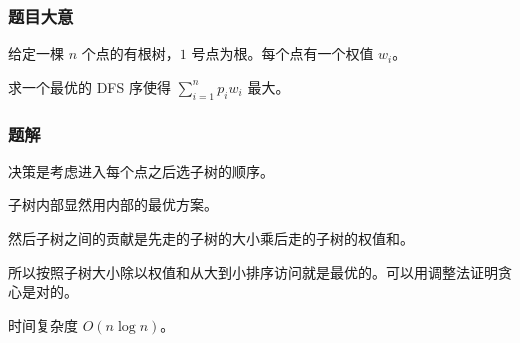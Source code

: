 

\frame
{
  \frametitle{题目大意}

给定一棵 $n$ 个点的有根树，$1$ 号点为根。每个点有一个权值 $w_i$。

求一个最优的 DFS 序使得 $\sum\limits_{i=1}^n p_iw_i$ 最大。

}


\frame
{
  \frametitle{题解}

 	决策是考虑进入每个点之后选子树的顺序。\pause

子树内部显然用内部的最优方案。\pause

然后子树之间的贡献是先走的子树的大小乘后走的子树的权值和。\pause

所以按照子树大小除以权值和从大到小排序访问就是最优的。可以用调整法证明贪心是对的。\pause

时间复杂度 $O(n\log n)$。

}
